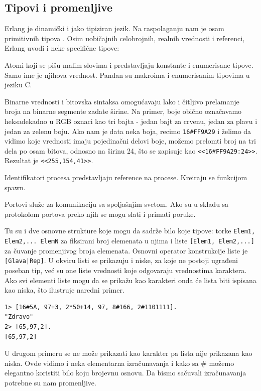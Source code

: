 \documentclass[a4paper]{article}
\begin{document}
\subsection{Tipovi i promenljive}
Erlang je dinamički i jako tipiziran jezik. 
Na raspolaganju nam je osam primitivnih tipova \cite{phdthesis}. 
Osim uobičajnih celobrojnih, realnih vrednosti i referenci, Erlang uvodi i neke specifične tipove:
\begin{list}{•}{}
\item Atomi koji se pišu malim slovima i predstavljaju konstante i enumerisane tipove. Samo ime je njihova vrednost. Pandan su makroima i enumerisanim tipovima u jeziku C.
\item Binarne vrednosti i bitovska sintaksa omogućavaju lako i čitljivo prelamanje broja na binarne segmente zadate širine. 
Na primer, boje obično označavamo heksadekadno u RGB oznaci kao tri bajta - jedan bajt za crvenu, jedan za plavu i jedan za zelenu boju.
Ako nam je data neka boja, recimo {\texttt{16#FF9A29}} i
želimo da vidimo koje vrednosti imaju pojedinačni delovi boje, možemo
prelomti broj na tri dela po osam bitova, odnosno na širinu 24, što se 
zapisuje kao {\texttt{<<16#FF9A29:24>>}}. Rezultat je {\texttt{<<255,154,41>>}}.
\item Identifikatori procesa predstavljaju reference na procese. Kreiraju se funkcijom spawn.
\item Portovi služe za komunikaciju sa spoljašnjim svetom. Ako su u skladu sa protokolom portova preko njih se mogu slati i primati poruke.
\end{list}
 
Tu su i dve osnovne strukture koje mogu da sadrže bilo koje tipove: torke
{\texttt{{Elem1, Elem2,... ElemN}}} za fiksirani broj elemenata u njima 
i liste {\texttt{[Elem1, Elem2,...]}} za čuvanje promenjivog broja elemenata. 
Osnovni operator konstrukcije liste je {\texttt{[Glava|Rep]}}. 
U okviru listi se prikazuju i niske, za koje ne postoji ugrađeni poseban tip, 
već su one liste vrednosti koje odgovaraju vrednostima karaktera. Ako svi elementi liste mogu da se prikažu kao karakteri onda će lista biti ispisana kao niska, što ilustruje naredni primer.
\begin{verbatim}
1> [16#5A, 97+3, 2*50+14, 97, 8#166, 2#1101111].
"Zdravo"
2> [65,97,2].
[65,97,2]
\end{verbatim}
U drugom primeru se ne može prikazati kao karakter pa lista nije prikazana kao niska. 
Ovde vidimo i neka elementarna izračunavanja i kako sa \# možemo elegantno koristiti bilo koju brojevnu osnovu. 
Da bismo sačuvali izračunavanja potrebne su nam promenljive.\\
\end{document}
